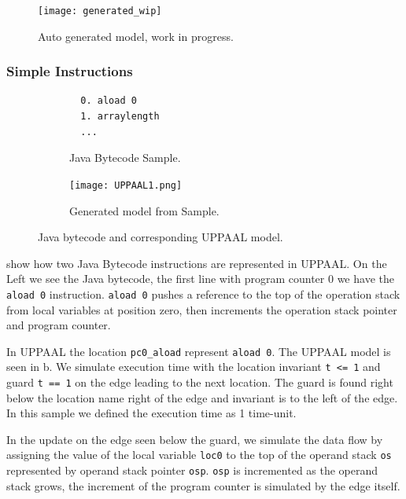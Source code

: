 \begin{figure}[H]
\texttt{[image: generated\_wip]}
\caption{Auto generated model, work in progress.}
\label{fig:generated_wip}
\end{figure}

\subsubsection{Simple Instructions}
\begin{figure}[H]
\centering
\begin{subfigure}{.3\textwidth}
  \begin{lstlisting}
  0. aload 0
  1. arraylength
  ...
  \end{lstlisting}
  \caption{Java Bytecode Sample.}
\end{subfigure} 
\hspace{10px}
\begin{subfigure}{.6\textwidth}
  \texttt{[image: UPPAAL1.png]}
  \caption{Generated model from Sample.}
\end{subfigure}
\caption{Java bytecode and corresponding UPPAAL model.}
\label{fig:uppaal1}
\end{figure}
 show how two Java Bytecode instructions are represented in UPPAAL. On the Left we see the Java bytecode, the first line with program counter 0 we have the \texttt{aload 0} instruction. \texttt{aload 0} pushes a reference to the top of the operation stack from local variables at position zero, then increments the operation stack pointer and program counter.

In UPPAAL the location \texttt{pc0\_aload} represent \texttt{aload 0}. The UPPAAL model is seen in b. We simulate execution time with the location invariant \texttt{t <= 1}  and guard \texttt{t == 1} on the edge leading to the next location. The guard is found right below the location name right of the edge and invariant is to the left of the edge. In this sample we defined the execution time as 1 time-unit.

In the update on the edge seen below the guard, we simulate the data flow by assigning the value of the local variable \texttt{loc0} to the top of the operand stack \texttt{os} represented by operand stack pointer \texttt{osp}. \texttt{osp} is incremented as the operand stack grows, the increment of the program counter is simulated by the edge itself.

